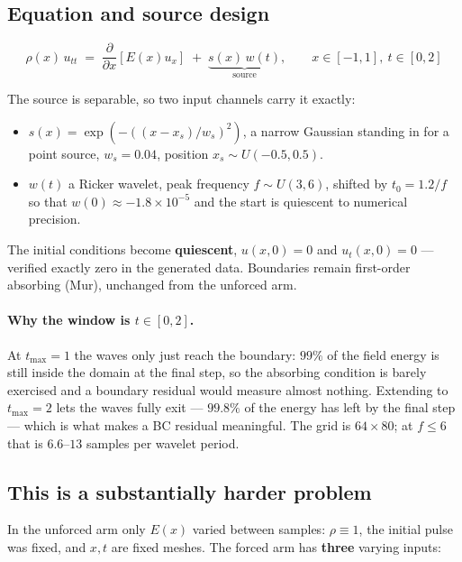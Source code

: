 \documentclass[11pt,a4paper]{article}
\begin{document}
\subsection{Equation and source design}

\begin{equation}
\rho(x)\,u_{tt} \;=\; \frac{\partial}{\partial x}\!\left[E(x)u_x\right]
\;+\; \underbrace{s(x)\,w(t)}_{\text{source}},
\qquad x\in[-1,1],\ t\in[0,2]
\end{equation}

The source is separable, so two input channels carry it exactly:

\begin{itemize}[leftmargin=*,itemsep=2pt]
\item $s(x)=\exp\!\left(-((x-x_s)/w_s)^2\right)$, a narrow Gaussian standing in
for a point source, $w_s=0.04$, position $x_s\sim U(-0.5,0.5)$.
\item $w(t)$ a Ricker wavelet, peak frequency $f\sim U(3,6)$, shifted by
$t_0=1.2/f$ so that $w(0)\approx-1.8\times10^{-5}$ and the start is quiescent to
numerical precision.
\end{itemize}

\noindent The initial conditions become \textbf{quiescent}, $u(x,0)=0$ and
$u_t(x,0)=0$ --- verified exactly zero in the generated data. Boundaries remain
first-order absorbing (Mur), unchanged from the unforced arm.

\paragraph{Why the window is $t\in[0,2]$.} At $t_{\max}=1$ the waves only just
reach the boundary: $99\%$ of the field energy is still inside the domain at the
final step, so the absorbing condition is barely exercised and a boundary
residual would measure almost nothing. Extending to $t_{\max}=2$ lets the waves
fully exit --- $99.8\%$ of the energy has left by the final step --- which is
what makes a BC residual meaningful. The grid is $64\times80$; at
$f\le6$ that is $6.6$--$13$ samples per wavelet period.

\subsection{This is a substantially harder problem}

In the unforced arm only $E(x)$ varied between samples: $\rho\equiv1$, the
initial pulse was fixed, and $x,t$ are fixed meshes. The forced arm has
\textbf{three} varying inputs:
\end{document}
